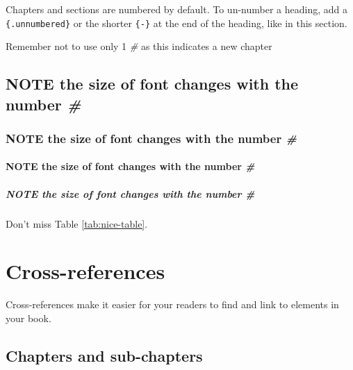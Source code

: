 \documentclass[
]{book}
\theoremstyle{definition}
\theoremstyle{definition}
\theoremstyle{definition}
\theoremstyle{definition}
\theoremstyle{remark}
\begin{document}
Chapters and sections are numbered by default. To un-number a heading, add a \texttt{\{.unnumbered\}} or the shorter \texttt{\{-\}} at the end of the heading, like in this section.

Remember not to use only 1 \emph{\#} as this indicates a new chapter

\section{\texorpdfstring{NOTE the size of font changes with the number \emph{\#}}{NOTE the size of font changes with the number \#}}\label{note-the-size-of-font-changes-with-the-number}

\subsection{\texorpdfstring{NOTE the size of font changes with the number \emph{\#}}{NOTE the size of font changes with the number \#}}\label{note-the-size-of-font-changes-with-the-number-1}

\subsubsection{\texorpdfstring{NOTE the size of font changes with the number \emph{\#}}{NOTE the size of font changes with the number \#}}\label{note-the-size-of-font-changes-with-the-number-2}

\paragraph{\texorpdfstring{NOTE the size of font changes with the number \emph{\#}}{NOTE the size of font changes with the number \#}}\label{note-the-size-of-font-changes-with-the-number-3}

Don't miss Table \ref{tab:nice-table}.

\chapter{Cross-references}\label{cross}

Cross-references make it easier for your readers to find and link to elements in your book.

\section{Chapters and sub-chapters}\label{chapters-and-sub-chapters}
\end{document}
